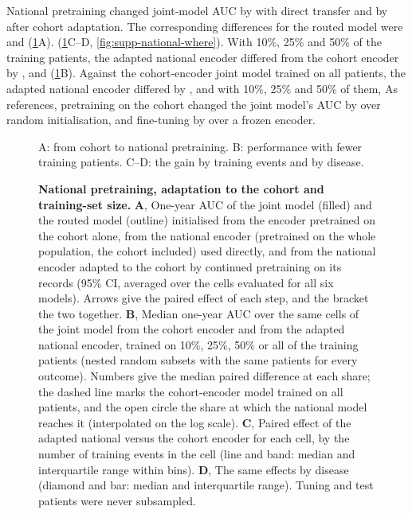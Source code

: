 \FloatBarrier
{}
National pretraining changed joint-model AUC by  with
direct transfer and by  after cohort adaptation.
The corresponding differences for the routed model were 
and  (\cref{fig:encoder-transfer}A).
  (\cref{fig:encoder-transfer}C--D, \cref{fig:supp-national-where}).
With 10\%, 25\% and 50\% of the training patients, the adapted national encoder
differed from the cohort encoder by ,  and
 (\cref{fig:encoder-transfer}B). Against the cohort-encoder joint model trained on all patients, the
adapted national encoder differed by , 
and  with 10\%, 25\% and 50\% of them,  As references, pretraining
on the cohort changed the joint model's AUC by  over random
initialisation, and fine-tuning by  over a frozen encoder.

\begin{figure}[H]
    {A: from cohort to national pretraining. B: performance with fewer training
    patients. C--D: the gain by training events and by disease.}
  \caption{\textbf{National pretraining, adaptation to the cohort and
  training-set size.} \textbf{A}, One-year AUC of the joint model (filled) and the routed model
  (outline) initialised from the encoder pretrained on the cohort alone, from
  the national encoder (pretrained on the whole population, the cohort
  included) used directly, and from the national encoder adapted to the cohort
  by continued pretraining on its records (95\% CI,
  averaged over the cells evaluated for all six models). Arrows give the paired
  effect of each step, and the bracket the two together. \textbf{B}, Median
  one-year AUC over the same cells of the joint model from the cohort encoder
  and from the adapted national encoder, trained on 10\%, 25\%, 50\% or all of
  the training patients (nested random subsets with the same patients for every
  outcome). Numbers give the median paired difference at each share; the dashed
  line marks the cohort-encoder model trained on all patients, and the open circle the
  share at which the national model reaches it (interpolated on the log scale).
  \textbf{C}, Paired effect of the adapted national versus the cohort encoder
  for each cell, by the number of training events in the cell (line and band:
  median and interquartile range within bins). \textbf{D}, The same effects by
  disease (diamond and bar: median and interquartile range). Tuning and
  test patients were never subsampled.}
  \label{fig:encoder-transfer}
\end{figure}

